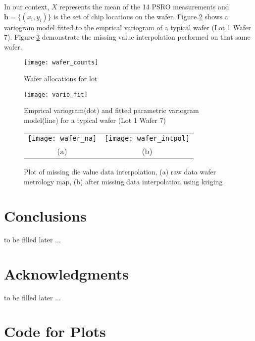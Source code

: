 \documentclass[12pt]{article}
\numberwithin{equation}{section}
\numberwithin{table}{section}
\numberwithin{figure}{section}
\newcommand{\bmh}{\bm{h}}
\newlength{\fwtwo} \setlength{\fwtwo}{0.45\textwidth}
\begin{document}
In our context, $X$ represents the mean of the 14 PSRO measurements
and $\bmh = \{ (x_i, y_i) \}$ is the set of chip locations on the wafer.
Figure \ref{vario_fit} shows a variogram model fitted to the
emprical variogram of a typical wafer (Lot 1 Wafer 7). Figure
\ref{wafer_fill} demonstrate the missing value interpolation performed
on that same wafer.

\begin{figure} \centering
  \texttt{[image: wafer\_counts]}
  \tiny \caption{Wafer allocations for lot}
  \label{wafer_counts}
\end{figure}

\begin{figure} \centering
  \texttt{[image: vario\_fit]}
  \tiny \caption{Emprical variogram(dot) and fitted parametric 
  variogram model(line) for a typical wafer (Lot 1 Wafer 7)}
  \label{vario_fit}
\end{figure}

\begin{figure} \centering
  \begin{tabular}{cc}
    \texttt{[image: wafer\_na]} &
    \texttt{[image: wafer\_intpol]} \\
    (a) & (b)
  \end{tabular}
  \caption{Plot of missing die value data interpolation,
  (a) raw data wafer metrology map, (b) after missing data
  interpolation using kriging}
  \label{wafer_fill}
\end{figure}













\section{Conclusions}

to be filled later ... 


\section*{Acknowledgments}

to be filled later ... 

 
\appendix

\section{Code for Plots} \label{appcode}






\end{document}
